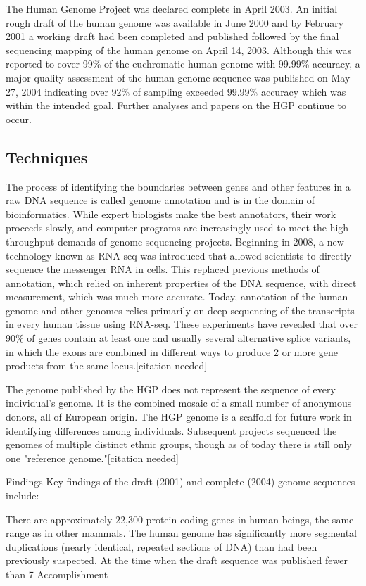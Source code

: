 \documentclass[12pt]{article}
\begin{document}
The Human Genome Project was declared complete in April 2003. An initial rough draft of the human genome was available in June 2000 and by February 2001 a working draft had been completed and published followed by the final sequencing mapping of the human genome on April 14, 2003. Although this was reported to cover 99\% of the euchromatic human genome with 99.99\% accuracy, a major quality assessment of the human genome sequence was published on May 27, 2004 indicating over 92\% of sampling exceeded 99.99\% accuracy which was within the intended goal. Further analyses and papers on the HGP continue to occur.

\subsection{Techniques}

The process of identifying the boundaries between genes and other features in a raw DNA sequence is called genome annotation and is in the domain of bioinformatics. While expert biologists make the best annotators, their work proceeds slowly, and computer programs are increasingly used to meet the high-throughput demands of genome sequencing projects. Beginning in 2008, a new technology known as RNA-seq was introduced that allowed scientists to directly sequence the messenger RNA in cells. This replaced previous methods of annotation, which relied on inherent properties of the DNA sequence, with direct measurement, which was much more accurate. Today, annotation of the human genome and other genomes relies primarily on deep sequencing of the transcripts in every human tissue using RNA-seq. These experiments have revealed that over 90\% of genes contain at least one and usually several alternative splice variants, in which the exons are combined in different ways to produce 2 or more gene products from the same locus.[citation needed]

The genome published by the HGP does not represent the sequence of every individual's genome. It is the combined mosaic of a small number of anonymous donors, all of European origin. The HGP genome is a scaffold for future work in identifying differences among individuals. Subsequent projects sequenced the genomes of multiple distinct ethnic groups, though as of today there is still only one "reference genome."[citation needed]

Findings
Key findings of the draft (2001) and complete (2004) genome sequences include:

There are approximately 22,300 protein-coding genes in human beings, the same range as in other mammals.
The human genome has significantly more segmental duplications (nearly identical, repeated sections of DNA) than had been previously suspected.
At the time when the draft sequence was published fewer than 7%
Accomplishment
\end{document}
